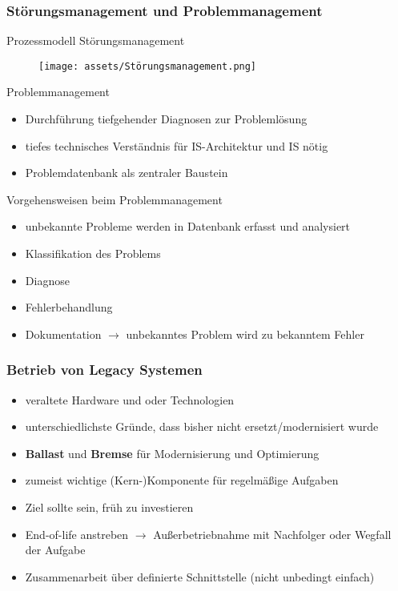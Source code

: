 \subsubsection{Störungsmanagement und Problemmanagement}
Prozessmodell Störungsmanagement

\begin{figure}[h]
\centering
\texttt{[image: assets/Störungsmanagement.png]}
\end{figure}

Problemmanagement

\begin{itemize}
  \item Durchführung tiefgehender Diagnosen zur Problemlösung
  \item tiefes technisches Verständnis für IS-Architektur und IS nötig
  \item Problemdatenbank als zentraler Baustein
\end{itemize}

Vorgehensweisen beim Problemmanagement

\begin{itemize}
  \item unbekannte Probleme werden in Datenbank erfasst und analysiert
  \item Klassifikation des Problems
  \item Diagnose
  \item Fehlerbehandlung
  \item Dokumentation $\rightarrow$ unbekanntes Problem wird zu bekanntem Fehler
\end{itemize}

\subsubsection{Betrieb von Legacy Systemen}

\begin{itemize}
  \item veraltete Hardware und oder Technologien
  \item unterschiedlichste Gründe, dass bisher nicht ersetzt/modernisiert wurde
  \item \textbf{Ballast} und \textbf{Bremse} für Modernisierung und Optimierung
  \item zumeist wichtige (Kern-)Komponente für regelmäßige Aufgaben
  \item Ziel sollte sein, früh zu investieren
  \item End-of-life anstreben $\rightarrow$ Außerbetriebnahme mit Nachfolger oder Wegfall der Aufgabe
  \item Zusammenarbeit über definierte Schnittstelle (nicht unbedingt einfach)
\end{itemize}

